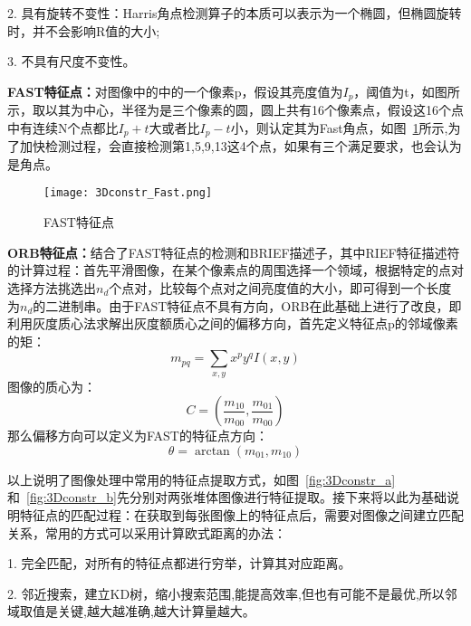 2. 具有旋转不变性：Harris角点检测算子的本质可以表示为一个椭圆，但椭圆旋转时，并不会影响R值的大小;

3. 不具有尺度不变性。

\textbf{FAST特征点：}对图像中的中的一个像素p，假设其亮度值为$I_p$，阈值为t，如图所示，取以其为中心，半径为是三个像素的圆，圆上共有16个像素点，假设这16个点中有连续N个点都比$I_p+t$大或者比$I_p-t$小，则认定其为Fast角点，如图~\ref{fig:3Dconstr_Fast}所示,为了加快检测过程，会直接检测第1,5,9,13这4个点，如果有三个满足要求，也会认为是角点。
\begin{figure}[H] %
  \centering
  \texttt{[image: 3Dconstr\_Fast.png]}
  \caption{FAST特征点}
  \label{fig:3Dconstr_Fast}
\end{figure}
\textbf{ORB特征点：}结合了FAST特征点的检测和BRIEF描述子，其中RIEF特征描述符的计算过程：首先平滑图像，在某个像素点的周围选择一个领域，根据特定的点对选择方法挑选出$n_d$个点对，比较每个点对之间亮度值的大小，即可得到一个长度为$n_d$的二进制串。由于FAST特征点不具有方向，ORB在此基础上进行了改良，即利用灰度质心法求解出灰度额质心之间的偏移方向，首先定义特征点p的邻域像素的矩：
\begin{equation}
  m_{p q}=\sum_{x, y} x^{p} y^{q} I(x, y)
\end{equation}
图像的质心为：
\begin{equation}
  C=\left(\frac{m_{10}}{m_{00}}, \frac{m_{01}}{m_{00}}\right)
\end{equation}
那么偏移方向可以定义为FAST的特征点方向：
\begin{equation}
  \theta=\arctan \left(m_{01}, m_{10}\right)
\end{equation}

以上说明了图像处理中常用的特征点提取方式，如图~\ref{fig:3Dconstr_a}和~\ref{fig:3Dconstr_b}先分别对两张堆体图像进行特征提取。接下来将以此为基础说明特征点的匹配过程：在获取到每张图像上的特征点后，需要对图像之间建立匹配关系，常用的方式可以采用计算欧式距离的办法：

1. 完全匹配，对所有的特征点都进行穷举，计算其对应距离。

2. 邻近搜索，建立KD树，缩小搜索范围,能提高效率,但也有可能不是最优,所以邻域取值是关键,越大越准确,越大计算量越大。


